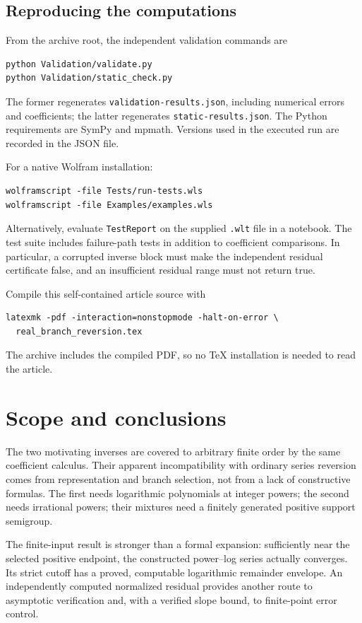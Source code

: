 \documentclass[11pt,a4paper]{article}
\numberwithin{equation}{section}
\theoremstyle{definition}
\theoremstyle{remark}
\newcommand{\code}[1]{\texttt{#1}}
\begin{document}
\subsection{Reproducing the computations}

From the archive root, the independent validation commands are
\begin{lstlisting}[language={}]
python Validation/validate.py
python Validation/static_check.py
\end{lstlisting}
The former regenerates \code{validation-results.json}, including numerical
errors and coefficients; the latter regenerates
\code{static-results.json}. The Python requirements are SymPy and mpmath.
Versions used in the executed run are recorded in the JSON file.

For a native Wolfram installation:
\begin{lstlisting}[language={}]
wolframscript -file Tests/run-tests.wls
wolframscript -file Examples/examples.wls
\end{lstlisting}
Alternatively, evaluate \code{TestReport} on the supplied \code{.wlt}
file in a notebook. The test suite includes failure-path tests in addition
to coefficient comparisons. In particular, a corrupted inverse block must
make the independent residual certificate false, and an insufficient
residual range must not return true.

Compile this self-contained article source with
\begin{lstlisting}[language={}]
latexmk -pdf -interaction=nonstopmode -halt-on-error \
  real_branch_reversion.tex
\end{lstlisting}
The archive includes the compiled PDF, so no TeX installation is needed
to read the article.

\section{Scope and conclusions}
\label{sec:conclusion}

The two motivating inverses are covered to arbitrary finite order by the
same coefficient calculus. Their apparent incompatibility with ordinary
series reversion comes from representation and branch selection, not
from a lack of constructive formulas. The first needs logarithmic
polynomials at integer powers; the second needs irrational powers; their
mixtures need a finitely generated positive support semigroup.

The finite-input result is stronger than a formal expansion: sufficiently
near the selected positive endpoint, the constructed power--log series
actually converges. Its strict cutoff has a proved, computable logarithmic
remainder envelope. An independently computed normalized residual
provides another route to asymptotic verification and, with a verified
slope bound, to finite-point error control.
\end{document}
